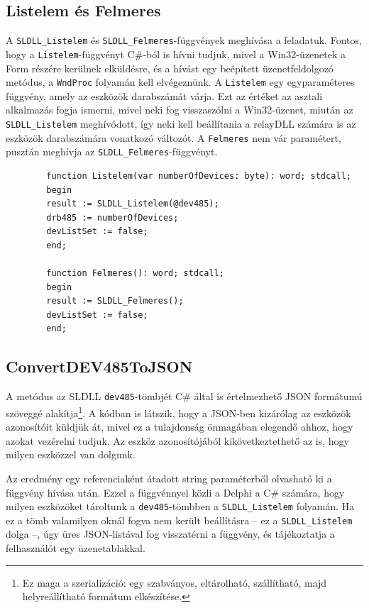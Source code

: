 \documentclass[tocnopagenum]{thesis-ekf}
\begin{document}
	\subsection{Listelem és Felmeres} A \verb*|SLDLL_Listelem| és \verb*|SLDLL_Felmeres|-függvények meghívása a feladatuk. Fontos, hogy a \verb*|Listelem|-függvényt C\#-ból is hívni tudjuk, mivel a Win32-üzenetek a Form részére kerülnek elküldésre, és a hívást egy beépített üzenetfeldolgozó metódus, a \verb*|WndProc| folyamán kell elvégeznünk. A \verb*|Listelem| egy egyparaméteres függvény, amely az eszközök darabszámát várja. Ezt az értéket az asztali alkalmazás fogja ismerni, mivel neki fog visszaszólni a Win32-üzenet, miután az \verb*|SLDLL_Listelem| meghívódott, így neki kell beállítania a relayDLL számára is az eszközök darabszámára vonatkozó változót. A \verb*|Felmeres| nem vár paramétert, pusztán meghívja az \verb*|SLDLL_Felmeres|-függvényt.
	
	\begin{verbatim}
		function Listelem(var numberOfDevices: byte): word; stdcall;
		begin
		result := SLDLL_Listelem(@dev485);
		drb485 := numberOfDevices;
		devListSet := false;
		end;
		
		function Felmeres(): word; stdcall;
		begin
		result := SLDLL_Felmeres();
		devListSet := false;
		end;
	\end{verbatim}

	\subsection{ConvertDEV485ToJSON}
	A metódus az SLDLL \verb*|dev485|-tömbjét C\# által is értelmezhető JSON formátumú szöveggé alakítja\footnote{Ez maga a szerializáció: egy szabványos, eltárolható, szállítható, majd helyreállítható formátum elkészítése.}. A kódban is látszik, hogy a JSON-ben kizárólag az eszközök azonosítóit küldjük át, mivel ez a tulajdonság önmagában elegendő ahhoz, hogy azokat vezérelni tudjuk. Az eszköz azonosítójából kikövetkeztethető az is, hogy milyen eszközzel van dolgunk.
	
	Az eredmény egy referenciaként átadott string paraméterből olvasható ki a függvény hívása után. Ezzel a függvénnyel közli a Delphi a C\# számára, hogy milyen eszközöket tároltunk a \verb*|dev485|-tömbben a \verb*|SLDLL_Listelem| folyamán. Ha ez a tömb valamilyen oknál fogva nem került beállításra -- ez a \verb*|SLDLL_Listelem| dolga --, úgy üres JSON-listával fog visszatérni a függvény, és tájékoztatja a felhasználót egy üzenetablakkal.
	
\end{document}
